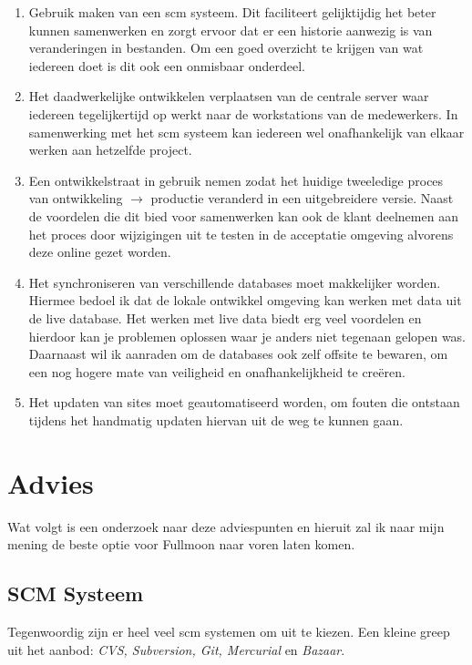 \documentclass[12pt,a4paper]{article}
\begin{document}
  \begin{enumerate}
    \item Gebruik maken van een {\sc scm} systeem. Dit faciliteert gelijktijdig het beter kunnen 
    samenwerken en zorgt ervoor dat er een historie aanwezig is van veranderingen in bestanden. Om een 
    goed overzicht te krijgen van wat iedereen doet is dit ook een onmisbaar onderdeel.
    \item Het daadwerkelijke ontwikkelen verplaatsen van de centrale server waar iedereen tegelijkertijd op werkt naar de workstations van de medewerkers. In samenwerking met het {\sc scm} systeem kan iedereen wel onafhankelijk van elkaar werken aan hetzelfde project.
    \item Een ontwikkelstraat in gebruik nemen zodat het huidige tweeledige proces van ontwikkeling $\to$ productie veranderd in een uitgebreidere versie. Naast de voordelen die dit bied voor samenwerken kan ook de klant deelnemen aan het proces door wijzigingen uit te testen in de acceptatie omgeving alvorens deze online gezet worden.
    \item Het synchroniseren van verschillende databases moet makkelijker worden. Hiermee bedoel ik dat de lokale ontwikkel omgeving kan werken met data uit de live database. Het werken met live data biedt erg veel voordelen en hierdoor kan je problemen oplossen waar je anders niet tegenaan gelopen was. Daarnaast wil ik aanraden om de databases ook zelf offsite te bewaren, om een nog hogere mate van veiligheid en onafhankelijkheid te cre\"{e}ren.
    \item Het updaten van sites moet geautomatiseerd worden, om fouten die ontstaan tijdens het handmatig updaten hiervan uit de weg te kunnen gaan.
  \end{enumerate}
  
  \section{Advies}

  Wat volgt is een onderzoek naar deze adviespunten en hieruit zal ik naar mijn mening de beste optie voor Fullmoon naar voren laten komen.
  
    \subsection{SCM Systeem}
    
    Tegenwoordig zijn er heel veel {\sc scm} systemen om uit te kiezen. Een kleine greep uit het aanbod: \emph{CVS, Subversion, Git, Mercurial} en \emph{Bazaar}.
    
\end{document}

